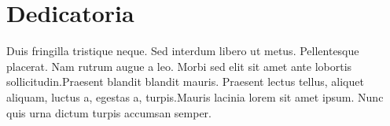 \chapter{Dedicatoria}
Duis fringilla tristique neque. Sed interdum libero ut metus.
Pellentesque placerat. Nam rutrum augue a leo. Morbi sed 
elit sit amet ante lobortis sollicitudin.Praesent blandit 
blandit mauris. Praesent lectus tellus, aliquet aliquam,
luctus a, egestas a, turpis.Mauris lacinia lorem sit amet
ipsum. Nunc quis urna dictum turpis accumsan semper.